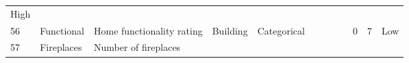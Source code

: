 \documentclass[11pt]{article}
\begin{document}
\begin{longtable}[]{@{}llllllllllll@{}}
\begin{minipage}[t]{0.04\columnwidth}
High\strut
\end{minipage}\tabularnewline
\begin{minipage}[t]{0.04\columnwidth}\raggedright\strut
56\strut
\end{minipage} & \begin{minipage}[t]{0.04\columnwidth}\raggedright\strut
Functional\strut
\end{minipage} & \begin{minipage}[t]{0.04\columnwidth}\raggedright\strut
Home functionality rating\strut
\end{minipage} & \begin{minipage}[t]{0.04\columnwidth}\raggedright\strut
Building\strut
\end{minipage} & \begin{minipage}[t]{0.04\columnwidth}\raggedright\strut
Categorical\strut
\end{minipage} & \begin{minipage}[t]{0.04\columnwidth}\raggedright\strut
\strut
\end{minipage} & \begin{minipage}[t]{0.04\columnwidth}\raggedright\strut
\strut
\end{minipage} & \begin{minipage}[t]{0.04\columnwidth}\raggedright\strut
\strut
\end{minipage} & \begin{minipage}[t]{0.04\columnwidth}\raggedright\strut
\strut
\end{minipage} & \begin{minipage}[t]{0.04\columnwidth}\raggedright\strut
0\strut
\end{minipage} & \begin{minipage}[t]{0.04\columnwidth}\raggedright\strut
7\strut
\end{minipage} & \begin{minipage}[t]{0.04\columnwidth}\raggedright\strut
Low\strut
\end{minipage}\tabularnewline
\begin{minipage}[t]{0.04\columnwidth}\raggedright\strut
57\strut
\end{minipage} & \begin{minipage}[t]{0.04\columnwidth}\raggedright\strut
Fireplaces\strut
\end{minipage} & \begin{minipage}[t]{0.04\columnwidth}\raggedright\strut
Number of fireplaces\strut
\end{minipage} & \begin{minipage}[t]{0.04\columnwidth}\raggedright\strut

\end{minipage}
\end{longtable}
\end{document}
